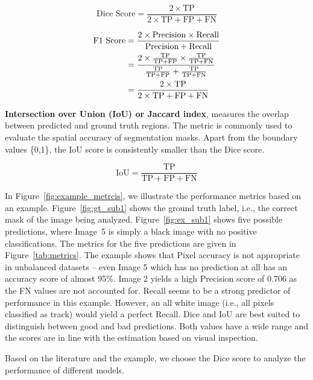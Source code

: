 \documentclass[Master,MDS,english]{BASE/twbook} %
\begin{document}
\[
\text{Dice Score} = \frac{2 \times \text{TP}}{2 \times \text{TP} + \text{FP} + \text{FN}}
\]

\begin{align*}
    \text{F1 Score} &= \frac{2 \times \text{Precision} \times \text{Recall}}{\text{Precision} + \text{Recall}} \\
    \vspace{1em}
     &= \frac{2 \times \frac{\text{TP}}{\text{TP} + \text{FP}} \times \frac{\text{TP}}{\text{TP} + \text{FN}}}{\frac{\text{TP}}{\text{TP} + \text{FP}} + \frac{\text{TP}}{\text{TP} + \text{FN}}} \\
    \vspace{1em}
     &= \frac{2 \times \text{TP}}{2 \times \text{TP} + \text{FP} + \text{FN}}
\end{align*}


\vspace{1cm}

\noindent\textbf{Intersection over Union (IoU) or Jaccard index}, measures the overlap between predicted and ground truth regions. The metric is commonly used to evaluate the spatial accuracy of segmentation masks. Apart from the boundary values \{0,1\}, the IoU score is consistently smaller than the Dice score.

\[
\text{IoU} = \frac{\text{TP}}{\text{TP} + \text{FP} + \text{FN}}
\]

\vspace{1cm}

In Figure~\ref{fig:example_metrcis}, we illustrate the performance metrics based on an example. Figure~\ref{fig:gt_sub1} shows the ground truth label, i.e., the correct mask of the image being analyzed. Figure~\ref{fig:ex_sub1} shows five possible predictions, where Image~5 is simply a black image with no positive classifications. The metrics for the five predictions are given in Figure~\ref{tab:metrics}. The example shows that Pixel accuracy is not appropriate in unbalanced datasets -- even Image 5 which has no prediction at all has an accuracy score of almost 95\%. Image 2 yields a high Precision score of 0.706 as the FN values are not accounted for.  Recall seems to be a strong predictor of performance in this example. However, an all white image (i.e., all pixels classified as track) would yield a perfect Recall. Dice and IoU are best suited to distinguish between good and bad predictions. Both values have a wide range and the scores are in line with the estimation based on visual inspection.

Based on the literature and the example, we choose the Dice score to analyze the performance of different models.
\end{document}
